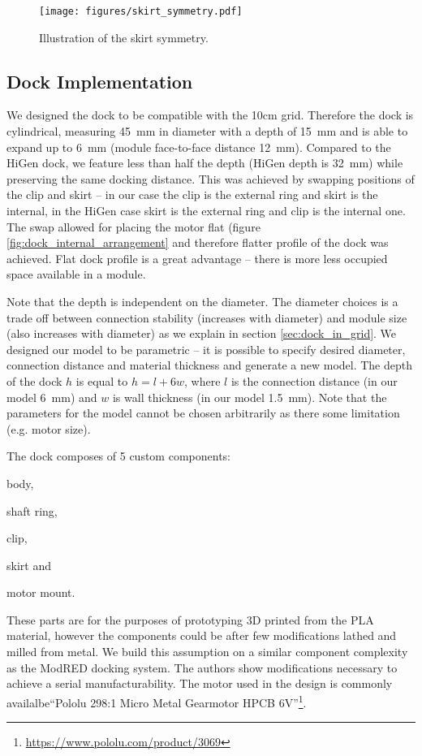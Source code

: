 \begin{figure}[h!]
    \centering
    \texttt{[image: figures/skirt\_symmetry.pdf]}
    \caption{Illustration of the skirt symmetry.}
    \label{fig:dock_skirt_symmetry}
\end{figure}

\subsection{Dock Implementation}

We designed the dock to be compatible with the 10cm grid. Therefore the dock is
cylindrical, measuring 45~mm in diameter with a depth of 15~mm and is able to
expand up to 6~mm (module face-to-face distance 12~mm). Compared to the HiGen
dock, we feature less than half the depth (HiGen depth is 32~mm) while
preserving the same docking distance. This was achieved by swapping positions of
the clip and skirt -- in our case the clip is the external ring and skirt is the
internal, in the HiGen case skirt is the external ring and clip is the internal
one. The swap allowed for placing the motor flat (figure
\ref{fig:dock_internal_arrangement} and therefore flatter profile of the dock
was achieved. Flat dock profile is a great advantage -- there is more less
occupied space available in a module.

Note that the depth is independent on the diameter. The diameter choices is a
trade off between connection stability (increases with diameter) and module size
(also increases with diameter) as we explain in section \ref{sec:dock_in_grid}.
We designed our model to be parametric -- it is possible to specify desired
diameter, connection distance and material thickness and generate a new model.
The depth of the dock $h$ is equal to $h=l+6w$, where $l$ is the connection
distance (in our model 6~mm) and $w$ is wall thickness (in our model 1.5~mm).
Note that the parameters for the model cannot be chosen arbitrarily as there
some limitation (e.g. motor size).

The dock composes of 5 custom components:
\begin{enumerate*}
    \item body,
    \item shaft ring,
    \item clip,
    \item skirt and
    \item motor mount.
\end{enumerate*}
These parts are for the purposes of prototyping 3D printed from the PLA
material, however the components could be after few modifications lathed and
milled from metal. We build this assumption on a similar component complexity as
the ModRED docking system\cite{hossain_towards_2014}. The authors show
modifications necessary to achieve a serial manufacturability. The motor used in
the design is commonly availalbe``Pololu 298:1 Micro Metal Gearmotor HPCB
6V''\footnote{\url{https://www.pololu.com/product/3069}}.

